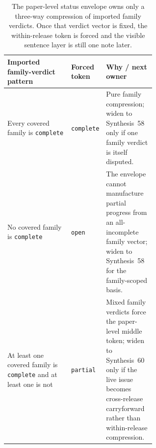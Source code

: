 \documentclass[11pt]{article}
\begin{document}
\begin{table}[t]
\centering
\small
\begin{tabularx}{0.97\linewidth}{@{}p{0.43\linewidth}p{0.17\linewidth}X@{}}
\toprule
\textbf{Imported family-verdict pattern} & \textbf{Forced token} & \textbf{Why / next owner}\\
\midrule
Every covered family is \texttt{complete} & \texttt{complete} & Pure family compression; widen to Synthesis~58 only if one family verdict is itself disputed.\\
No covered family is \texttt{complete} & \texttt{open} & The envelope cannot manufacture partial progress from an all-incomplete family vector; widen to Synthesis~58 for the family-scoped basis.\\
At least one covered family is \texttt{complete} and at least one is not & \texttt{partial} & Mixed family verdicts force the paper-level middle token; widen to Synthesis~60 only if the live issue becomes cross-release carryforward rather than within-release compression.\\
\bottomrule
\end{tabularx}
\caption{The paper-level status envelope owns only a three-way compression of imported family verdicts. Once that verdict vector is fixed, the within-release token is forced and the visible sentence layer is still one note later.}
\label{tab:public-request-status-token-matrix}
\end{table}
\end{document}
